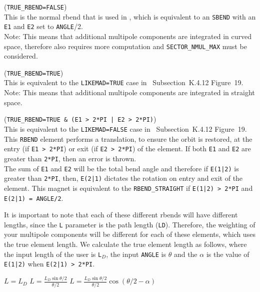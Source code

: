 \begin{madlist}
   (\texttt{TRUE\_RBEND=FALSE}) \\
  This is the normal rbend that is used in \madx, which is equivalent
  to an \texttt{SBEND} with an \texttt{E1} and \texttt{E2} set to \texttt{ANGLE}/2. \\
  Note: This means that additional multipole components are integrated in curved space,
  therefore also requires more computation and \texttt{SECTOR\_NMUL\_MAX} must be considered.

   (\texttt{TRUE\_RBEND=TRUE}) \\
  This is equivalent to the \texttt{LIKEMAD=TRUE} case
  in \cite{forest2002}~Subsection~K.4.12 Figure~19. \\
  Note: This means that additional multipole components are integrated in straight space.
  
   (\texttt{TRUE\_RBEND=TRUE \& (E1 > 2*PI | E2 > 2*PI)}) \\
  This is equivalent to the \texttt{LIKEMAD=FALSE} case in \cite{forest2002}~Subsection~K.4.12 Figure~19. \\
  This \texttt{RBEND} element performs a translation, to ensure the orbit is restored,
  at the entry (if \texttt{E1 > 2*PI}) or exit (if \texttt{E2 > 2*PI}) of the element.
  If both \texttt{E1} and \texttt{E2} are greater than \texttt{2*PI}, then an 
  error is thrown. \\
  The sum of \texttt{E1} and \texttt{E2} will be the total bend angle
  and therefore if \texttt{E(1|2)} is greater than \texttt{2*PI}, 
  then, \texttt{E(2|1)} dictates the rotation on entry and exit of the element.
  This magnet is equivalent to the \texttt{RBEND\_STRAIGHT} if \texttt{E(1|2) > 2*PI} 
  and \texttt{E(2|1) = ANGLE/2}.
  

\end{madlist}

It is important to note that each of these different rbends will have different 
lengths, since the \texttt{L} parameter is the path length (\texttt{LD}). 
Therefore, the weighting of your multipole components will be different 
for each of these elements, which uses the true element length. We calculate 
the true element length as follows, where the input length of the user is 
\texttt{L$_D$}, the input \texttt{ANGLE} is $\theta$ and the $\alpha$ is the value
of \texttt{E(1|2)} when \texttt{E(2|1) > 2*PI}.

\begin{madlist}
   $L = L_D$
    $L =\frac{L_D\sin \theta/2}{\theta/2}$
   $L = \frac{L_D\sin \theta/2}{\theta/2} \cos{(\theta/2-\alpha)} $
\end{madlist}


